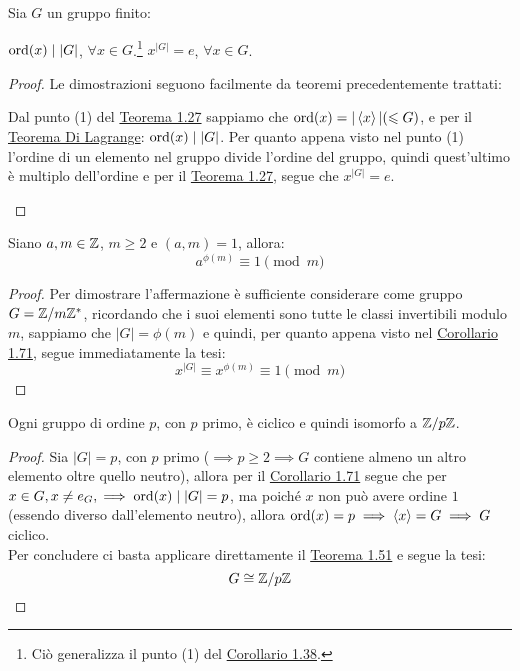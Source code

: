 \documentclass[11pt]{scrartcl}
\begin{document}
\begin{corollary}
\label{g:OrdLagrange}
Sia $G$ un gruppo finito:
	\begin{enumerate}[(1)]
	\ii $\operatorname{ord}(x) \mid |G|$, $\forall x \in G$.\footnote{Ciò generalizza il punto (1) del \hyperref[g:ordiniZn]{Corollario 1.38}.}
	\ii $x^{|G|}=e$, $\forall x \in G$.
	\end{enumerate}
\end{corollary}

\begin{proof}
Le dimostrazioni seguono facilmente da teoremi precedentemente trattati:
	\begin{enumerate}[(1)]
	\ii Dal punto (1) del \hyperref[thm:g_due]{Teorema 1.27} sappiamo che $\operatorname{ord}(x)=|\left<x\right>| (\leqslant G)$, e per il \hyperref[g:Lagrange]{Teorema Di Lagrange}: $\operatorname{ord}(x) \mid |G|$.
	\ii Per quanto appena visto nel punto (1) l'ordine di un elemento nel gruppo divide l'ordine del gruppo, quindi quest'ultimo è multiplo dell'ordine e per il \hyperref[thm:g_due]{Teorema 1.27}, segue che $x^{|G|}=e$.
	\end{enumerate}
\end{proof}

\begin{corollary}
Siano $a,m \in \mathbb Z$, $m \geq 2$ e $(a,m)=1$, allora:
	\[ a^{\phi(m)} \equiv 1 \pmod{m}\]
\end{corollary}

\begin{proof}
Per dimostrare l'affermazione è sufficiente considerare come gruppo $G={\mathbb Z}/m{\mathbb Z}^*$, ricordando che i suoi elementi sono tutte le classi invertibili modulo $m$, sappiamo che $|G|=\phi(m)$ e quindi, per quanto appena visto nel \hyperref[g:OrdLagrange]{Corollario 1.71}, segue immediatamente la tesi:
	\[ x^{|G|} \equiv x^{\phi(m)} \equiv 1 \pmod{m}
	\]
\end{proof}

\begin{corollary}
\label{g:Gp}
Ogni gruppo di ordine $p$, con $p$ primo, è ciclico e quindi isomorfo a $\mathbb Z/p\mathbb Z$.
\end{corollary}

\begin{proof}
Sia $|G|=p$, con $p$ primo ($\implies p \geq 2 \implies G$ contiene almeno un altro elemento oltre quello neutro), allora per il \hyperref[g:OrdLagrange]{Corollario 1.71} segue che per $x \in G, x \neq e_G, \implies \operatorname{ord}(x) \mid |G| = p$, ma poiché $x$ non può avere ordine $1$ (essendo diverso dall'elemento neutro), allora $\operatorname{ord}(x)=p \implies \left<x\right>=G \implies G$ ciclico. \\
Per concludere ci basta applicare direttamente il \hyperref[g:Iso_ciclici]{Teorema 1.51} e segue la tesi:
	\[ G \cong \mathbb Z/p\mathbb Z 
	\]
\end{proof}
\end{document}
